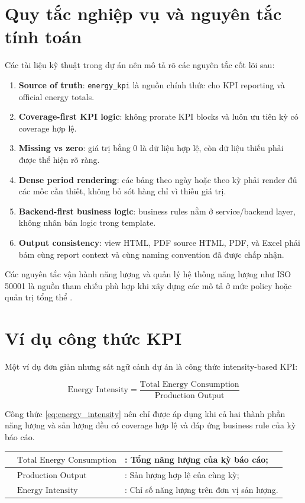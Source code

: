 \section{Quy tắc nghiệp vụ và nguyên tắc tính toán}

Các tài liệu kỹ thuật trong dự án nên mô tả rõ các nguyên tắc cốt lõi sau:

\begin{enumerate}[label=-]
\item \textbf{Source of truth}: \texttt{energy\_kpi} là nguồn chính thức cho KPI reporting và official energy totals.
\item \textbf{Coverage-first KPI logic}: không prorate KPI blocks và luôn ưu tiên kỳ có coverage hợp lệ.
\item \textbf{Missing vs zero}: giá trị bằng 0 là dữ liệu hợp lệ, còn dữ liệu thiếu phải được thể hiện rõ ràng.
\item \textbf{Dense period rendering}: các bảng theo ngày hoặc theo kỳ phải render đủ các mốc cần thiết, không bỏ sót hàng chỉ vì thiếu giá trị.
\item \textbf{Backend-first business logic}: business rules nằm ở service/backend layer, không nhân bản logic trong template.
\item \textbf{Output consistency}: view HTML, PDF source HTML, PDF, và Excel phải bám cùng report context và cùng naming convention đã được chấp nhận.
\end{enumerate}

Các nguyên tắc vận hành năng lượng và quản lý hệ thống năng lượng như ISO 50001 là nguồn tham chiếu phù hợp khi xây dựng các mô tả ở mức policy hoặc quản trị tổng thể \cite{ref_iso50001}.

\section{Ví dụ công thức KPI}

Một ví dụ đơn giản nhưng sát ngữ cảnh dự án là công thức intensity-based KPI:

\begin{equation}
	\text{Energy Intensity} = \frac{\text{Total Energy Consumption}}{\text{Production Output}}
	\label{eq:energy_intensity}
\end{equation}

Công thức \ref{eq:energy_intensity} nên chỉ được áp dụng khi cả hai thành phần năng lượng và sản lượng đều có coverage hợp lệ và đáp ứng business rule của kỳ báo cáo.

\begin{tabular}{|p{0.5cm}|l|l|}
	\hline
	& $\text{Total Energy Consumption}$ &: Tổng năng lượng của kỳ báo cáo;\\ \hline
	& $\text{Production Output}$ &: Sản lượng hợp lệ của cùng kỳ;\\ \hline
	& $\text{Energy Intensity}$ &: Chỉ số năng lượng trên đơn vị sản lượng.\\ \hline
\end{tabular}

